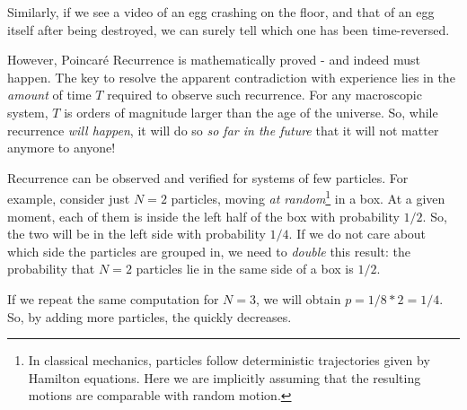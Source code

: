 \documentclass[../template.tex]{subfiles}
\begin{document}
Similarly, if we see a video of an egg crashing on the floor, and that of an egg  itself after being destroyed, we can surely tell which one has been time-reversed. 

\medskip

However, Poincaré Recurrence is mathematically proved - and indeed must happen. The key to resolve the apparent contradiction with experience lies in the \textit{amount} of time $T$ required to observe such recurrence. For any macroscopic system, $T$ is orders of magnitude larger than the age of the universe. So, while recurrence \textit{will happen}, it will do so \textit{so far in the future} that it will not matter anymore to anyone!

\medskip

Recurrence can be observed and verified for systems of few particles. For example, consider just $N=2$ particles, moving \textit{at random}\footnote{In classical mechanics, particles follow deterministic trajectories given by Hamilton equations. Here we are implicitly assuming that the resulting motions are comparable with random motion.} in a box. At a given moment, each of them is inside the left half of the box with probability $1/2$. So, the two will be in the left side with probability $1/4$. If we do not care about which side the particles are grouped in, we need to \textit{double} this result: the probability that $N=2$ particles lie in the same side of a box is $1/2$.

\medskip

If we repeat the same computation for $N=3$, we will obtain $p=1/8 * 2 = 1/4$. So, by adding more particles, the  quickly decreases. 


\medskip






\end{document}
